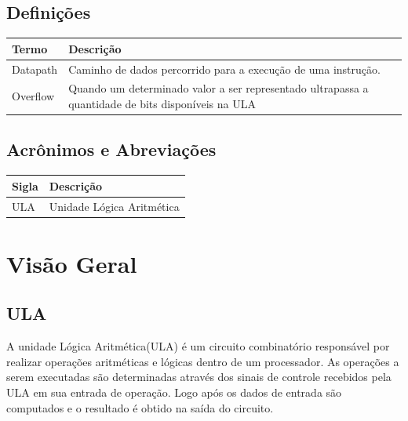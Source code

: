 \documentclass{report}
\begin{document}
  \section{Definições}
    \FloatBarrier
    \begin{table}[H]
      \begin{center}
        \begin{tabular}[pos]{|m{5cm} | m{9cm}|} 
          \hline
          \cellcolor[gray]{0.9}\textbf{Termo} & \cellcolor[gray]{0.9}\textbf{Descrição} \\ \hline
          Datapath & Caminho de dados percorrido para a execução de uma instrução. \\ \hline
          Overflow & Quando um determinado valor a ser representado ultrapassa a quantidade de bits disponíveis na ULA \\ \hline         
        \end{tabular}
      \end{center}
    \end{table}  

  \section{Acrônimos e Abreviações}
    \FloatBarrier
    \begin{table}[H]
      \begin{center}
        \begin{tabular}[pos]{|m{2cm} | m{12cm}|} 
          \hline
          \cellcolor[gray]{0.9}\textbf{Sigla} & \cellcolor[gray]{0.9}\textbf{Descrição} \\ \hline
            ULA & Unidade Lógica Aritmética \\ \hline
        \end{tabular}
      \end{center}
    \end{table}  

\chapter{Visão Geral}
\section{ULA}

    A unidade Lógica Aritmética(ULA) é um circuito combinatório responsável por realizar operações aritméticas e lógicas dentro de um processador. As operações a serem executadas são determinadas através dos sinais de controle recebidos pela ULA em sua entrada de operação. Logo após os dados de entrada são computados e o resultado é obtido na saída do circuito.
    
\end{document}
